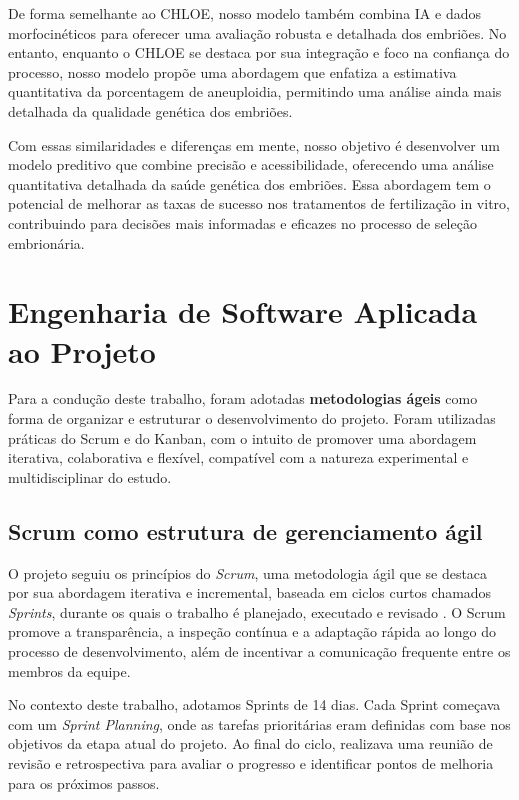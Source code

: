 De forma semelhante ao CHLOE\texttrademark{}, nosso modelo também combina IA e dados morfocinéticos para oferecer uma avaliação robusta e detalhada dos embriões. No entanto, enquanto o CHLOE\texttrademark{} se destaca por sua integração e foco na confiança do processo, nosso modelo propõe uma abordagem que enfatiza a estimativa quantitativa da porcentagem de aneuploidia, permitindo uma análise ainda mais detalhada da qualidade genética dos embriões. 

Com essas similaridades e diferenças em mente, nosso objetivo é desenvolver um modelo preditivo que combine precisão e acessibilidade, oferecendo uma análise quantitativa detalhada da saúde genética dos embriões. Essa abordagem tem o potencial de melhorar as taxas de sucesso nos tratamentos de fertilização in vitro, contribuindo para decisões mais informadas e eficazes no processo de seleção embrionária.

\section{Engenharia de Software Aplicada ao Projeto}
Para a condução deste trabalho, foram adotadas \textbf{metodologias ágeis} como forma de organizar e estruturar o desenvolvimento do projeto. Foram utilizadas práticas do Scrum e do Kanban, com o intuito de promover uma abordagem iterativa, colaborativa e flexível, compatível com a natureza experimental e multidisciplinar do estudo.

\subsection{Scrum como estrutura de gerenciamento ágil}
O projeto seguiu os princípios do \textit{Scrum}, uma metodologia ágil que se destaca por sua abordagem iterativa e incremental, baseada em ciclos curtos chamados \textit{Sprints}, durante os quais o trabalho é planejado, executado e revisado \cite{schwaber2010scrum}. O Scrum promove a transparência, a inspeção contínua e a adaptação rápida ao longo do processo de desenvolvimento, além de incentivar a comunicação frequente entre os membros da equipe.

No contexto deste trabalho, adotamos Sprints de 14 dias. Cada Sprint começava com um \textit{Sprint Planning}, onde as tarefas prioritárias eram definidas com base nos objetivos da etapa atual do projeto. Ao final do ciclo, realizava uma reunião de revisão e retrospectiva para avaliar o progresso e identificar pontos de melhoria para os próximos passos.

